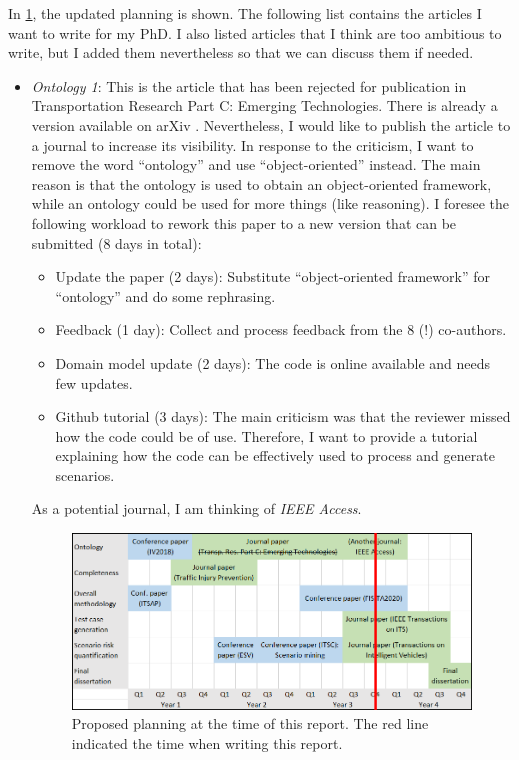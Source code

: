 \documentclass[10pt,final,a4paper,oneside,onecolumn]{article}
\begin{document}
In \cref{fig:planning}, the updated planning is shown. The following list contains the articles I want to write for my PhD. I also listed articles that I think are too ambitious to write, but I added them nevertheless so that we can discuss them if needed.
\begin{itemize}
	\item \textit{Ontology 1}: This is the article that has been rejected for publication in Transportation Research Part C: Emerging Technologies. There is already a version available on arXiv \cite{degelder2020ontology}. Nevertheless, I would like to publish the article to a journal to increase its visibility. In response to the criticism, I want to remove the word ``ontology'' and use ``object-oriented'' instead. The main reason is that the ontology is used to obtain an object-oriented framework, while an ontology could be used for more things (like reasoning). I foresee the following workload to rework this paper to a new version that can be submitted (8 days in total):
	\begin{itemize}
		\item Update the paper (2 days): Substitute ``object-oriented framework'' for ``ontology'' and do some rephrasing.
		\item Feedback (1 day): Collect and process feedback from the 8 (!) co-authors.
		\item Domain model update (2 days): The code is online available and needs few updates.
		\item Github tutorial (3 days): The main criticism was that the reviewer missed how the code could be of use. Therefore, I want to provide a tutorial explaining how the code can be effectively used to process and generate scenarios.
	\end{itemize}
	As a potential journal, I am thinking of \textit{IEEE Access}.
	
	\begin{figure}[t]
		\centering
		\includegraphics[width=\linewidth]{planning.png}
		\caption{Proposed planning at the time of this report. The red line indicated the time when writing this report.}
		\label{fig:planning}
	\end{figure}
	

\end{itemize}
\end{document}
